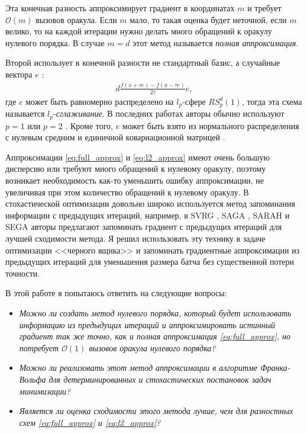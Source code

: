     Эта конечная разность аппроксимирует градиент в координатах $m$ и требует $\mathcal{O}(m)$ вызовов оракула. Если $m$ мало, то такая оценка будет неточной, если $m$ велико, то на каждой итерации нужно делать много обращений к оракулу нулевого порядка. В случае $m = d$ этот метод называется \textit{полная аппроксимация}.

    Второй использует в конечной разности не стандартный базис, а случайные вектора $e$ \cite{duchi2012randomized, nesterov2017random, gasnikov2022power, Randomized_gradient_free_methods_in_convex_optimization}:
    \begin{align} \label{eq:l2_approx}
        d \frac{f(x + \tau e) - f(x - \tau e)}{2 \tau} e,
    \end{align}
    где $e$ может быть равномерно распределено на $l_p$-сфере $RS^d_p(1)$, тогда эта схема называется $l_p$-\textit{сглаживание}. В последних работах авторы обычно используют $p = 1$ \cite{gasnikov2016gradient-free, akhavan2022gradient} или $p=2$ \cite{nemirovskij1983problem, shamir2017optimal, doi:10.1137/19M1259225}. Кроме того, $e$ может быть взято из нормального распределения с нулевым средним и единичной ковариационной матрицей \cite{nesterov2017random}.

    Аппроксимации \eqref{eq:full_approx} и \eqref{eq:l2_approx} имеют очень большую дисперсию или требуют много обращений к нулевому оракулу, поэтому возникает необходимость как-то уменьшить ошибку аппроксимации, не увеличивая при этом количество обращений к нулевому оракулу. В стохастической оптимизации довольно широко используется метод запоминания информации с предыдущих итераций, например, в SVRG \cite{johnson2013accelerating}, SAGA \cite{defazio2014saga}, SARAH \cite{nguyen2017sarah} и SEGA \cite{hanzely2018sega} авторы предлагают запоминать градиент с предыдущих итераций для лучшей сходимости метода.
    Я решил использовать эту технику в задаче оптимизации <<черного ящика>> и запоминать градиентные аппроксимации из предыдущих итераций для уменьшения размера батча без существенной потери точности.

    В этой работе я попытаюсь ответить на следующие вопросы:
    \begin{itemize}
        \item \textit{Можно ли создать метод нулевого порядка, который будет использовать информацию из предыдущих итераций и аппроксимировать истинный градиент так же точно, как и полная аппроксимация \eqref{eq:full_approx}, но потребует $\mathcal{O}(1)$ вызовов оракула нулевого порядка?}
        \item \textit{Можно ли реализовать этот метод аппроксимации в алгоритме Франка-Вольфа для детерминированных и стохастических постановок задач минимизации?}
        \item \textit{Является ли оценка сходимости этого метода лучше, чем для разностных схем \eqref{eq:full_approx} и \eqref{eq:l2_approx}?}
    \end{itemize}

